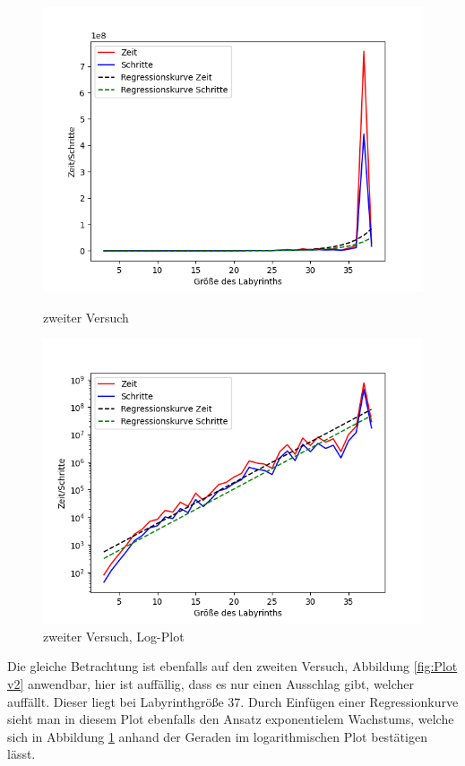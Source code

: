 \documentclass[12pt, a4paper, titlepage]{article}
\begin{document}
\begin{figure}[h]
\begin{minipage}{.5\textwidth}
	\includegraphics[scale=.45]{v2Aus.png}
	\caption{zweiter Versuch}
	\label{fig:Plot v2}
\end{minipage}
\begin{minipage}{.5\textwidth}
	\includegraphics[scale=.45]{v2AusLog.png}
	\caption{zweiter Versuch, Log-Plot}
	\label{fig:Plot v2Log}
\end{minipage}
\end{figure}

Die gleiche Betrachtung ist ebenfalls auf den zweiten Versuch, Abbildung \ref{fig:Plot v2} anwendbar, hier ist auffällig, dass es nur einen Ausschlag gibt, welcher auffällt.
Dieser liegt bei Labyrinthgröße 37.
Durch Einfügen einer Regressionkurve sieht man in diesem Plot ebenfalls den Ansatz exponentielem Wachstums, welche sich in Abbildung \ref{fig:Plot v2Log} anhand der Geraden im logarithmischen Plot bestätigen lässt.
\end{document}
